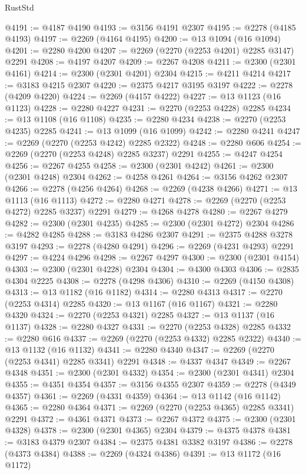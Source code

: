 \begin{lexlean}{RustStd}
\begin{coremodule}
@4191 := @4187 @4190
@4193 := @3156 @4191 @2307
@4195 := @2278 (@4185 @4193)
@4197 := @2269 (@4164 @4195)
@4200 := @13 @1094 (@16 @1094)
@4201 := @2280 @4200
@4207 := @2269 (@2270 (@2253 @4201) @2285 @3147) @2291
@4208 := @4197 @4207
@4209 := @2267 @4208
@4211 := @2300 (@2301 @4161)
@4214 := @2300 (@2301 @4201) @2304
@4215 := @4211 @4214
@4217 := @3183 @4215 @2307
@4220 := @2375 @4217 @3195 @3197
@4222 := @2278 (@4209 @4220)
@4224 := @2269 (@4157 @4222)
@4227 := @13 @1123 (@16 @1123)
@4228 := @2280 @4227
@4231 := @2270 (@2253 @4228) @2285
@4234 := @13 @1108 (@16 @1108)
@4235 := @2280 @4234
@4238 := @2270 (@2253 @4235) @2285
@4241 := @13 @1099 (@16 @1099)
@4242 := @2280 @4241
@4247 := @2269 (@2270 (@2253 @4242) @2285 @2322)
@4248 := @2280 @606
@4254 := @2269 (@2270 (@2253 @4248) @2285 @3237) @2291
@4255 := @4247 @4254
@4256 := @2267 @4255
@4258 := @2300 (@2301 @4242)
@4261 := @2300 (@2301 @4248) @2304
@4262 := @4258 @4261
@4264 := @3156 @4262 @2307
@4266 := @2278 (@4256 @4264)
@4268 := @2269 (@4238 @4266)
@4271 := @13 @1113 (@16 @1113)
@4272 := @2280 @4271
@4278 := @2269 (@2270 (@2253 @4272) @2285 @3237) @2291
@4279 := @4268 @4278
@4280 := @2267 @4279
@4282 := @2300 (@2301 @4235)
@4285 := @2300 (@2301 @4272) @2304
@4286 := @4282 @4285
@4288 := @3183 @4286 @2307
@4291 := @2375 @4288 @3278 @3197
@4293 := @2278 (@4280 @4291)
@4296 := @2269 (@4231 @4293) @2291
@4297 := @4224 @4296
@4298 := @2267 @4297
@4300 := @2300 (@2301 @4154)
@4303 := @2300 (@2301 @4228) @2304
@4304 := @4300 @4303
@4306 := @2835 @4304 @2225
@4308 := @2278 (@4298 @4306)
@4310 := @2269 (@4150 @4308)
@4313 := @13 @1182 (@16 @1182)
@4314 := @2280 @4313
@4317 := @2270 (@2253 @4314) @2285
@4320 := @13 @1167 (@16 @1167)
@4321 := @2280 @4320
@4324 := @2270 (@2253 @4321) @2285
@4327 := @13 @1137 (@16 @1137)
@4328 := @2280 @4327
@4331 := @2270 (@2253 @4328) @2285
@4332 := @2280 @616
@4337 := @2269 (@2270 (@2253 @4332) @2285 @2322)
@4340 := @13 @1132 (@16 @1132)
@4341 := @2280 @4340
@4347 := @2269 (@2270 (@2253 @4341) @2285 @3341) @2291
@4348 := @4337 @4347
@4349 := @2267 @4348
@4351 := @2300 (@2301 @4332)
@4354 := @2300 (@2301 @4341) @2304
@4355 := @4351 @4354
@4357 := @3156 @4355 @2307
@4359 := @2278 (@4349 @4357)
@4361 := @2269 (@4331 @4359)
@4364 := @13 @1142 (@16 @1142)
@4365 := @2280 @4364
@4371 := @2269 (@2270 (@2253 @4365) @2285 @3341) @2291
@4372 := @4361 @4371
@4373 := @2267 @4372
@4375 := @2300 (@2301 @4328)
@4378 := @2300 (@2301 @4365) @2304
@4379 := @4375 @4378
@4381 := @3183 @4379 @2307
@4384 := @2375 @4381 @3382 @3197
@4386 := @2278 (@4373 @4384)
@4388 := @2269 (@4324 @4386)
@4391 := @13 @1172 (@16 @1172)

\end{coremodule}
\end{lexlean}
